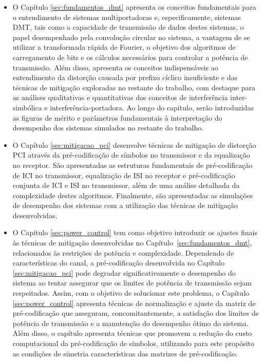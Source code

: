 \begin{itemize}
\item O Capítulo \ref{sec:fundamentos_dmt} apresenta os conceitos fundamentais para o entendimento de sistemas multiportadoras e, especificamente, sistemas DMT, tais como a capacidade de transmissão de dados destes sistemas, o papel desempenhado pela convolução circular no sistema, a vantagem de se utilizar a transformada rápida de Fourier, o objetivo dos algoritmos de carregamento de bits e os cálculos necessários para controlar a potência de transmissão. Além disso, apresenta os conceitos indispensáveis ao entendimento da distorção causada por prefixo cíclico insuficiente e das técnicas de mitigação exploradas no restante do trabalho, com destaque para as análises qualitativas e quantitativas dos conceitos de interferência inter-simbólica e interferência-portadora. Ao longo do capítulo, serão introduzidas as figuras de mérito e parâmetros fundamentais à interpretação do desempenho dos sistemas simulados no restante do trabalho.\\
\item O Capítulo \ref{sec:mitigacao_pci} desenvolve técnicas de mitigação de distorção PCI através da pré-codificação de símbolos no transmissor e da equalização no receptor. São apresentadas as estruturas fundamentais de pré-codificação de ICI no transmissor, equalização de ISI no receptor e pré-codificação conjunta de ICI e ISI no transmissor, além de uma análise detalhada da complexidade destes algoritmos. Finalmente, são apresentadas as simulações de desempenho dos sistemas com a utilização das técnicas de mitigação desenvolvidas.\\
\item O Capítulo \ref{sec:power_control}
tem como objetivo introduzir os ajustes finais às técnicas de mitigação desenvolvidas no Capítulo~\ref{sec:fundamentos_dmt}, relacionados às restrições de potência e complexidade. Dependendo de características do canal, a pré-codificação desenvolvida no Capítulo \ref{sec:mitigacao_pci} pode degradar significativamente o desempenho do sistema ao tentar assegurar que os limites de potência de transmissão sejam respeitados. Assim, com o objetivo de solucionar este problema, o Capítulo \ref{sec:power_control} apresenta técnicas de normalização e ajuste da matriz de pré-codificação que asseguram, concomitantemente, a satisfação dos limites de potência de transmissão e a manutenção do desempenho ótimo do sistema. Além disso, o capítulo apresenta técnicas que promovem a redução do custo computacional da pré-codificação de símbolos, utilizando para este propósito as condições de simetria características das matrizes de pré-codificação.

\end{itemize}
